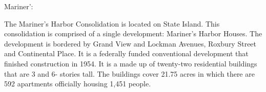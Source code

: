 Mariner':        

      

The Mariner's Harbor Consolidation is located on State Island. This consolidation is comprised of a single development: Mariner's Harbor Houses. The development is bordered by Grand View and Lockman Avenues, Roxbury Street and Continental Place. It is a federally funded conventional development that finished construction in 1954. It is a made up of twenty-two residential buildings that are 3 and 6- stories tall. The buildings cover 21.75 acres in which there are 592 apartments officially housing 1,451 people.    